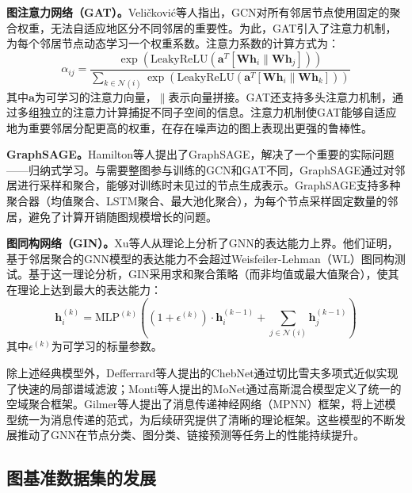 \textbf{图注意力网络（GAT）。}Veli\v{c}kovi\'{c}等人\cite{velickovic2018gat}指出，GCN对所有邻居节点使用固定的聚合权重，无法自适应地区分不同邻居的重要性。为此，GAT引入了注意力机制，为每个邻居节点动态学习一个权重系数。注意力系数的计算方式为：
\begin{equation}
  \alpha_{ij} = \frac{\exp\left(\text{LeakyReLU}\left(\mathbf{a}^T[\mathbf{W}\mathbf{h}_i \| \mathbf{W}\mathbf{h}_j]\right)\right)}{\sum_{k \in \mathcal{N}(i)} \exp\left(\text{LeakyReLU}\left(\mathbf{a}^T[\mathbf{W}\mathbf{h}_i \| \mathbf{W}\mathbf{h}_k]\right)\right)}
  \label{eq:gat}
\end{equation}
其中$\mathbf{a}$为可学习的注意力向量，$\|$表示向量拼接。GAT还支持多头注意力机制，通过多组独立的注意力计算捕捉不同子空间的信息。注意力机制使GAT能够自适应地为重要邻居分配更高的权重，在存在噪声边的图上表现出更强的鲁棒性。

\textbf{GraphSAGE。}Hamilton等人\cite{hamilton2017graphsage}提出了GraphSAGE，解决了一个重要的实际问题——归纳式学习。与需要整图参与训练的GCN和GAT不同，GraphSAGE通过对邻居进行采样和聚合，能够对训练时未见过的节点生成表示。GraphSAGE支持多种聚合器（均值聚合、LSTM聚合、最大池化聚合），为每个节点采样固定数量的邻居，避免了计算开销随图规模增长的问题。

\textbf{图同构网络（GIN）。}Xu等人\cite{xu2019gin}从理论上分析了GNN的表达能力上界。他们证明，基于邻居聚合的GNN模型的表达能力不会超过Weisfeiler-Lehman（WL）图同构测试。基于这一理论分析，GIN采用求和聚合策略（而非均值或最大值聚合），使其在理论上达到最大的表达能力：
\begin{equation}
  \mathbf{h}_i^{(k)} = \text{MLP}^{(k)}\left((1 + \epsilon^{(k)}) \cdot \mathbf{h}_i^{(k-1)} + \sum_{j \in \mathcal{N}(i)} \mathbf{h}_j^{(k-1)}\right)
  \label{eq:gin}
\end{equation}
其中$\epsilon^{(k)}$为可学习的标量参数。

除上述经典模型外，Defferrard等人\cite{defferrard2016chebnet}提出的ChebNet通过切比雪夫多项式近似实现了快速的局部谱域滤波；Monti等人\cite{monti2017monet}提出的MoNet通过高斯混合模型定义了统一的空域聚合框架。Gilmer等人\cite{gilmer2017mpnn}提出了消息传递神经网络（MPNN）框架，将上述模型统一为消息传递的范式，为后续研究提供了清晰的理论框架。这些模型的不断发展推动了GNN在节点分类、图分类、链接预测等任务上的性能持续提升\cite{zhou2020gnn_survey, wu2021gnn_survey}。

\subsection{图基准数据集的发展}


